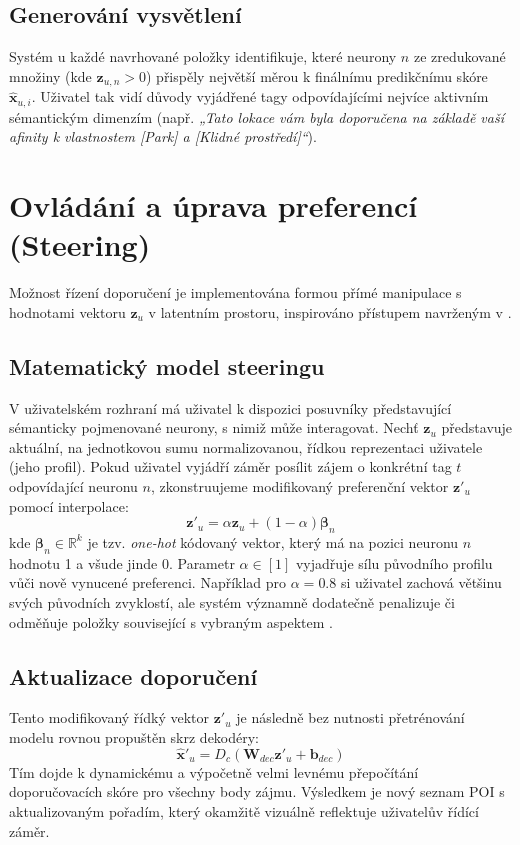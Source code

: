 \subsection{Generování vysvětlení}
Systém u každé navrhované položky identifikuje, které neurony $n$ ze zredukované množiny (kde $\mathbf{z}_{u,n} > 0$) přispěly největší měrou k finálnímu predikčnímu skóre $\mathbf{\hat{x}}_{u,i}$. Uživatel tak vidí důvody vyjádřené tagy odpovídajícími nejvíce aktivním sémantickým dimenzím (např. \textit{„Tato lokace vám byla doporučena na základě vaší afinity k vlastnostem [Park] a [Klidné prostředí]“}).

\section{Ovládání a úprava preferencí (Steering)}
\label{sec:ovladani}

Možnost řízení doporučení je implementována formou přímé manipulace s hodnotami vektoru $\mathbf{z}_u$ v latentním prostoru, inspirováno přístupem navrženým v \cite{Wang2021}.

\subsection{Matematický model steeringu}
V uživatelském rozhraní má uživatel k dispozici posuvníky představující sémanticky pojmenované neurony, s nimiž může interagovat. Nechť $\mathbf{z}_u$ představuje aktuální, na jednotkovou sumu normalizovanou, řídkou reprezentaci uživatele (jeho profil). Pokud uživatel vyjádří záměr posílit zájem o konkrétní tag $t$ odpovídající neuronu $n$, zkonstruujeme modifikovaný preferenční vektor $\mathbf{z}'_u$ pomocí interpolace:
\begin{equation}
    \mathbf{z}'_u = \alpha \mathbf{z}_u + (1-\alpha)\mathbf{\beta}_n
\end{equation}
kde $\mathbf{\beta}_n \in \mathbb{R}^k$ je tzv. \textit{one-hot} kódovaný vektor, který má na pozici neuronu $n$ hodnotu 1 a všude jinde 0. Parametr $\alpha \in [1]$ vyjadřuje sílu původního profilu vůči nově vynucené preferenci. Například pro $\alpha = 0.8$ si uživatel zachová většinu svých původních zvyklostí, ale systém významně dodatečně penalizuje či odměňuje položky související s vybraným aspektem \cite{Wang2021}.

\subsection{Aktualizace doporučení}
Tento modifikovaný řídký vektor $\mathbf{z}'_u$ je následně bez nutnosti přetrénování modelu rovnou propuštěn skrz dekodéry:
\begin{equation}
    \mathbf{\hat{x}}'_u = D_c(\mathbf{W}_{dec}\mathbf{z}'_u + \mathbf{b}_{dec})
\end{equation}
Tím dojde k dynamickému a výpočetně velmi levnému přepočítání doporučovacích skóre pro všechny body zájmu. Výsledkem je nový seznam POI s aktualizovaným pořadím, který okamžitě vizuálně reflektuje uživatelův řídící záměr.


